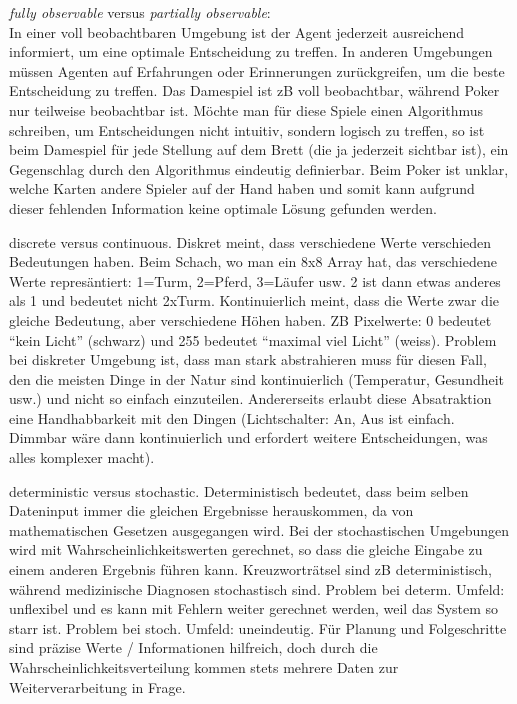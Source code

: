 \documentclass[10pt,a4paper]{article}
\begin{document}
		
		
		\noindent \textit{fully observable} versus \textit{partially observable}:
		\\ 
		In einer voll beobachtbaren Umgebung ist der Agent jederzeit ausreichend informiert, um eine optimale Entscheidung zu treffen. In anderen Umgebungen müssen Agenten auf Erfahrungen oder Erinnerungen zurückgreifen, um die beste Entscheidung zu treffen.
		Das Damespiel ist zB voll beobachtbar, während Poker nur teilweise beobachtbar ist. Möchte man für diese Spiele einen Algorithmus schreiben, um Entscheidungen nicht intuitiv, sondern logisch zu treffen, so ist beim Damespiel für jede Stellung auf dem Brett (die ja jederzeit sichtbar ist), ein Gegenschlag durch den Algorithmus eindeutig definierbar. Beim Poker ist unklar, welche Karten andere Spieler auf der Hand haben und somit kann aufgrund dieser fehlenden Information keine optimale Lösung gefunden werden.
		
		discrete versus continuous. 
		Diskret meint, dass verschiedene Werte verschieden Bedeutungen haben. Beim Schach, wo man ein 8x8 Array hat, das verschiedene Werte represäntiert: 1=Turm, 2=Pferd, 3=Läufer usw. 2 ist dann etwas anderes als 1 und bedeutet nicht 2xTurm.
		Kontinuierlich meint, dass die Werte zwar die gleiche Bedeutung, aber verschiedene Höhen haben. ZB Pixelwerte: 0 bedeutet “kein Licht” (schwarz) und 255 bedeutet “maximal viel Licht” (weiss). 
		Problem bei diskreter Umgebung ist, dass man stark abstrahieren muss für diesen Fall, den die meisten Dinge in der Natur sind kontinuierlich (Temperatur, Gesundheit usw.) und nicht so einfach einzuteilen. Andererseits erlaubt diese Absatraktion eine Handhabbarkeit mit den Dingen (Lichtschalter: An, Aus ist einfach. Dimmbar wäre dann kontinuierlich und erfordert weitere Entscheidungen, was alles komplexer macht).
		
		deterministic versus stochastic. 
		Deterministisch bedeutet, dass beim selben Dateninput immer die gleichen Ergebnisse herauskommen, da von mathematischen Gesetzen ausgegangen wird.
		Bei der stochastischen Umgebungen wird mit Wahrscheinlichkeitswerten gerechnet, so dass die gleiche Eingabe zu einem anderen Ergebnis führen kann.
		Kreuzworträtsel sind zB deterministisch, während medizinische Diagnosen stochastisch sind. Problem bei determ. Umfeld: unflexibel und es kann mit Fehlern weiter gerechnet werden, weil das System so starr ist. Problem bei stoch. Umfeld: uneindeutig. Für Planung und Folgeschritte sind präzise Werte / Informationen hilfreich, doch durch die Wahrscheinlichkeitsverteilung kommen stets mehrere Daten zur Weiterverarbeitung in Frage.
		
		
\end{document}
